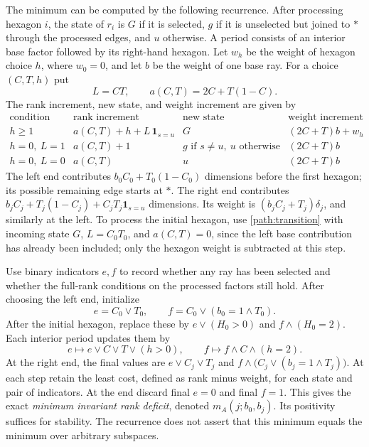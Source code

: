 The minimum can be computed by the following recurrence. After processing
hexagon $i$,
the state of $r_i$ is $G$ if it is selected, $g$ if it is unselected but joined
to $*$ through the processed edges, and $u$ otherwise. A period consists of
an interior base factor followed by its right-hand hexagon. Let $w_h$ be the
weight of hexagon choice $h$, where $w_0=0$, and let $b$ be the weight of one
base ray. For a choice $(C,T,h)$ put
\[
 L=CT,\qquad a(C,T)=2C+T(1-C).
\]
The rank increment, new state, and weight increment are given by
\begin{equation}\label{path:transition}
\begin{array}{c|c|c|c}
\text{condition}&\text{rank increment}&\text{new state}&\text{weight increment}\\ \hline
h\ge1&a(C,T)+h+L\,\mathbf1_{s=u}&G&(2C+T)b+w_h\\
h=0,\ L=1&a(C,T)+1&g\text{ if }s\ne u,\ u\text{ otherwise}&(2C+T)b\\
h=0,\ L=0&a(C,T)&u&(2C+T)b
\end{array}
\end{equation}
The left end contributes $b_0C_0+T_0(1-C_0)$ dimensions before the first
hexagon; its possible remaining edge starts at $*$. The right end contributes
$b_jC_j+T_j(1-C_j)+C_jT_j\mathbf1_{s=u}$ dimensions.
Its weight is $(b_jC_j+T_j)\delta_j$, and similarly at the left. To process
the initial hexagon, use \eqref{path:transition} with incoming state $G$,
$L=C_0T_0$, and $a(C,T)=0$, since the left base contribution has already
been included; only the hexagon weight is subtracted at this step.

Use binary indicators $e,f$ to record whether any ray has been selected
and whether the full-rank conditions on the processed factors still hold.
After choosing the left end, initialize
\[
 e=C_0\lor T_0,\qquad
 f=C_0\lor(b_0=1\land T_0).
\]
After the initial hexagon, replace these by $e\lor(H_0>0)$ and
$f\land(H_0=2)$. Each interior period updates them by
\[
 e\longmapsto e\lor C\lor T\lor(h>0),\qquad
 f\longmapsto f\land C\land(h=2).
\]
At the right end, the final values are $e\lor C_j\lor T_j$ and
$f\land\bigl(C_j\lor(b_j=1\land T_j)\bigr)$. At each step retain the
least cost, defined as rank minus weight, for each state and pair of
indicators. At the end discard final $e=0$ and final $f=1$. This gives the
exact \emph{minimum invariant rank deficit}, denoted $m_A(j;b_0,b_j)$.
Its positivity suffices for stability. The recurrence does not assert that
this minimum equals the minimum over arbitrary subspaces.

